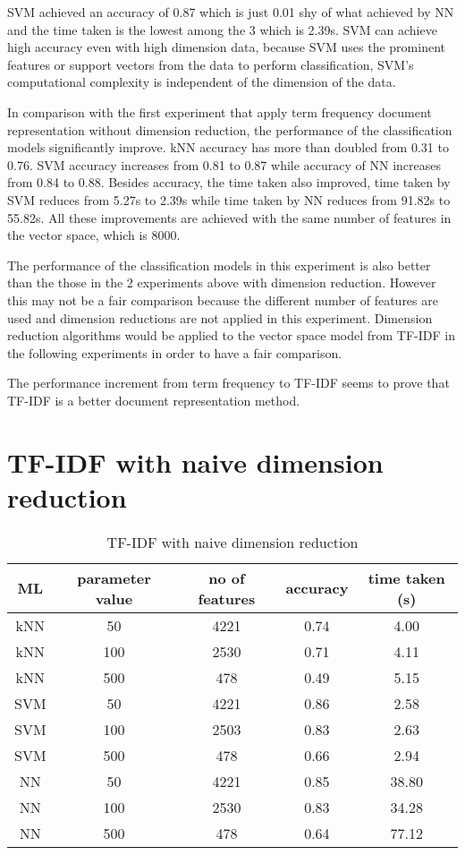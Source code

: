 SVM achieved an accuracy of 0.87 which is just 0.01 shy of what achieved by NN and the time taken is the lowest among the 3 which is 2.39s. SVM can achieve high accuracy even with high dimension data, because SVM uses the prominent features or support vectors from the data to perform classification, SVM's computational complexity is independent of the dimension of the data. \cite{dimRedCat}

In comparison with the first experiment that apply term frequency document representation without dimension reduction, the performance of the classification models significantly improve. kNN accuracy has more than doubled from 0.31 to 0.76. SVM accuracy increases from 0.81 to 0.87 while accuracy of NN increases from  0.84 to 0.88. Besides accuracy, the time taken also improved, time taken by SVM reduces from 5.27s to 2.39s while time taken by NN reduces from 91.82s to 55.82s. All these improvements are achieved with the same number of features in the vector space, which is 8000. 

The performance of the classification models in this experiment is also better than the those in the 2 experiments above with dimension reduction. However this may not be a fair comparison because the different number of features are used and dimension reductions are not applied in this experiment. Dimension reduction algorithms would be applied to the vector space model from TF-IDF in the following experiments in order to have a fair comparison.

The performance increment from term frequency to TF-IDF seems to prove that TF-IDF is a better document representation method.\\

\clearpage
\section{TF-IDF with naive dimension reduction}

\begin{table} [ht]
	\centering
	\begin{tabular}{|| c | c | c | c | c||}
		\hline
		ML & parameter value & no of features & accuracy & time taken (s) \\ [0.5ex]
		\hline\hline
		kNN & 50 & 4221 & 0.74 & 4.00 \\ 
		\hline
		kNN & 100 & 2530 & 0.71 & 4.11 \\ 
		\hline
		kNN & 500 & 478 & 0.49 & 5.15 \\ 
		\hline\hline
		SVM & 50 & 4221 & 0.86 & 2.58 \\
		\hline
		SVM & 100 & 2503 & 0.83 & 2.63 \\
		\hline
		SVM & 500 & 478 & 0.66 & 2.94 \\
		\hline\hline
		NN & 50 & 4221 & 0.85 & 38.80 \\
		\hline
		NN & 100 & 2530 & 0.83 & 34.28 \\
		\hline
		NN & 500 & 478 & 0.64 & 77.12 \\
		\hline
	\end{tabular}
\caption{TF-IDF with naive dimension reduction}
\label{tbl:tfidfNaive}
\end{table}

